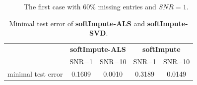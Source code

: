 \documentclass[11pt]{article}
\begin{document}
\begin{figure}[ht!]\centering                                                          
	\caption{The first case with 60\% missing entries and $SNR=1$.}
	\label{fig:3}	                                                    
\end{figure}

\begin{table}[t!]
	\caption{Minimal test error of \textbf{softImpute-ALS} and  \textbf{softImpute-SVD}.} 
	\centering 
	\begin{tabular}{c c c c c} 
		\hline\hline 
		\multirow{2}{*}{ } & \multicolumn{2}{c}{\textbf{softImpute-ALS}} & \multicolumn{2}{c}{\textbf{softImpute}} \\ \cline{2-5}
		&SNR=1&SNR=10&SNR=1&SNR=10 \\ \hline
		minimal test error&0.1609 &0.0010&0.3189&0.0149 \\ \hline

		
	\end{tabular}
	
\label{table: table 1} 
\end{table}
\end{document}
